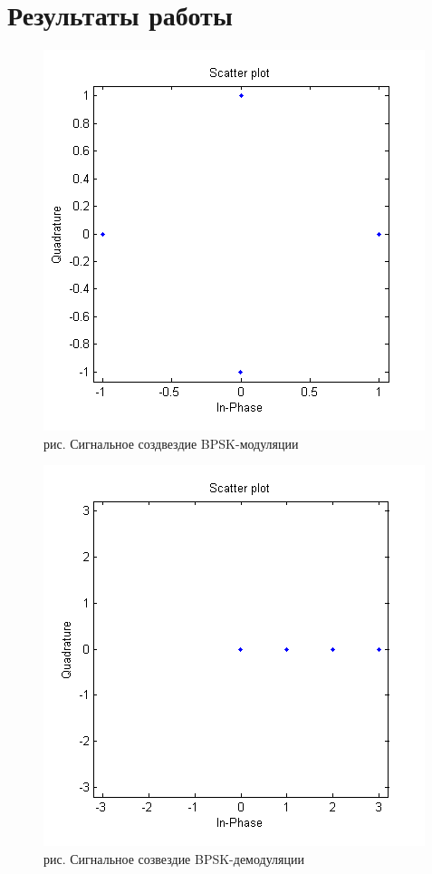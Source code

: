 \documentclass[10pt,a4paper]{report}
\begin{document}
\section{Результаты работы}
\clearpage
\begin{figure}
\begin{center}
\includegraphics[angle=0, scale = 0.8]{9_1}\newline
рис. Сигнальное создвездие BPSK-модуляции\newline
\end{center}
\end{figure}
\begin{figure}
\begin{center}
\includegraphics[angle=0, scale = 0.8]{9_2}\newline
рис. Сигнальное созвездие BPSK-демодуляции\newline
\end{center}
\end{figure}
\end{document}
